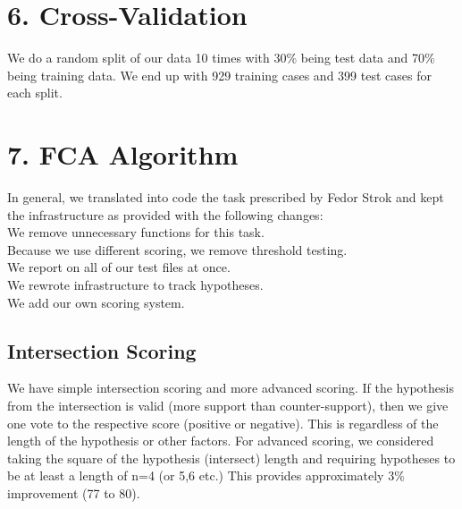 \documentclass[12pt, a4, epsf] {article}
\theoremstyle{plain}
\theoremstyle{definition}
\begin{document}
\section*{6. Cross-Validation}
We do a random split of our data 10 times with 30\% being test data and 70\% being training data. We end up with 929 training cases and 399 test cases for each split.
\section*{7. FCA Algorithm}
In general, we translated into code the task prescribed by Fedor Strok and kept the infrastructure as provided with the following changes:\\
We remove unnecessary functions for this task.\\
Because we use different scoring, we remove threshold testing.\\
We report on all of our test files at once.\\
We rewrote infrastructure to track hypotheses.\\
We add our own scoring system.\\
\subsection*{Intersection Scoring}
We have simple intersection scoring and more advanced scoring. If the hypothesis from the intersection is valid (more support than counter-support), then we give one vote to the respective score (positive or negative). This is regardless of the length of the hypothesis or other factors. For advanced scoring, we considered taking the square of the hypothesis (intersect) length and requiring hypotheses to be at least a length of n=4 (or 5,6 etc.) This provides approximately 3\% improvement (77 to 80).
\end{document}

